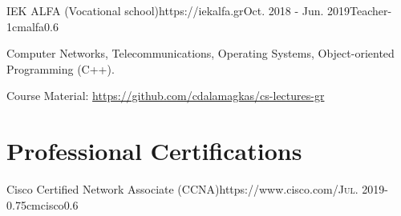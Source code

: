 \documentclass{mycv}
\begin{document}

	\begin{EntryDatedLogo}{IEK ALFA (Vocational school)}{https://iekalfa.gr}{Oct. 2018 - Jun. 2019}{Teacher}{-1cm}{alfa}{0.6}
		\begin{Itemize}
			\item Computer Networks, Telecommunications, Operating Systems, Object-oriented Programming (C++).
			\item Course Material: \url{https://github.com/cdalamagkas/cs-lectures-gr}
		\end{Itemize}
	\end{EntryDatedLogo}
		


		
	\section{Professional Certifications}
	\begin{EntryDatedLogo}{Cisco Certified Network Associate (CCNA)}{https://www.cisco.com/}{\scshape{Jul. 2019}}{}{-0.75cm}{cisco}{0.6}
	\end{EntryDatedLogo}
	
\end{document}
